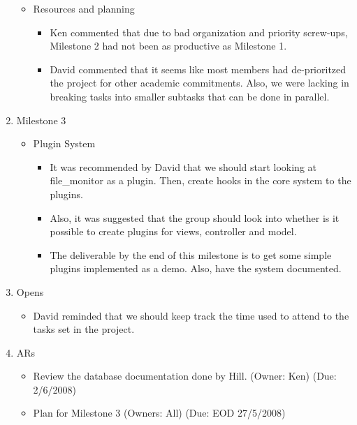 \documentclass{letter}
\begin{document}
\begin{enumerate}
\begin{itemize}
\begin{itemize}
			  \end{itemize}
	     \item Resources and planning
	         \begin{itemize}
	         	    \item Ken commented that due to bad organization and priority screw-ups, Milestone 2 had not been as productive as Milestone 1. 
		           \item David commented that it seems like most members had de-prioritzed the project for other academic commitments. Also, we were lacking in breaking tasks into smaller subtasks that can be done in parallel. 
	         \end{itemize}
	\end{itemize}
\item Milestone 3
    \begin{itemize}
        \item Plugin System
             \begin{itemize}
             	    \item It was recommended by David that we should start looking at file\_monitor as a plugin. Then, create hooks in the core system to the plugins. 
	               \item Also, it was suggested that the group should look into whether is it possible to create plugins for views, controller and model. 
	               \item The deliverable by the end of this milestone is to get some simple plugins implemented as a demo. Also, have the system documented. 
             \end{itemize}
    \end{itemize}
\item Opens
    \begin{itemize}
        \item David reminded that we should keep track the time used to attend to the tasks set in the project. 
    \end{itemize}
\item ARs
    \begin{itemize}
        \item Review the database documentation done by Hill. (Owner: Ken) (Due: 2/6/2008)
        \item Plan for Milestone 3 (Owners: All) (Due: EOD 27/5/2008)
    \end{itemize}
\end{enumerate} 
\end{document}
